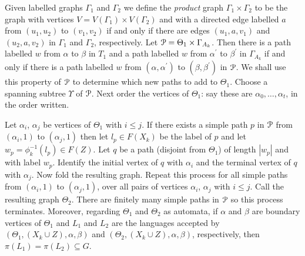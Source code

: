 \documentclass[a4paper,12pt]{article}
\renewcommand{\a}{\alpha }
\renewcommand{\b}{\beta }
\newcommand{\G}{\Gamma }
\newcommand{\T}{\Theta }
\newcommand{\U}{\Upsilon }
\newcommand{\cP}{{\cal{P}}}
\numberwithin{equation}{section}
\numberwithin{figure}{section}
\begin{document}
Given labelled graphs $\G_1$ and $\G_2$ we define the {\em
product} graph $\G_1\times \G_2$ to be the graph with vertices
$V=V(\G_1)\times V(\G_2)$ and with a directed edge labelled $a$
from $(u_1,u_2)$ to $(v_1,v_2)$ if and only if there are edges
$(u_1,a, v_1)$ and $(u_2,a,v_2)$ in $\G_1$ and $\G_2$,
respectively. Let $\cP=\T_1\times \G_{A_k}$. Then there is a path
 labelled $w$ from $\a$ to $\b$
in $T_1$ {\ef {$\T_1$?}}and a path labelled $w$ from $\a^\prime $
to $\b^\prime$ in $\G_{A_k}$ if and only if there is a path
labelled $w$ from $(\a,\a^\prime)$ to $(\b,\b^\prime)$ in $\cP$.
 We shall
use this property of $\cP$ to determine which new paths to add  to $\T_1$.
Choose a spanning  subtree $\U$ of  $\cP$. Next
 order the vertices of
$\T_1$: say these are $\a_0,\ldots, \a_t$, in the order written.

Let $\a_i$, $\a_j$ be vertices of  $\T_1$ with $i\le j$. If there
exists a simple path $p$ in $\cP$ from $(\a_i,1)$ to $(\a_j,1)$
then let $l_p\in F(X_k)$ be the label of $p$ and let
$w_p=\phi_k^{-1}(l_p)\in F(Z)$. Let $q$ be a path (disjoint from
$\T_1$) of length $|w_p|$ and with label $w_p$. Identify the
initial vertex of $q$ with $\a_i$ and the terminal vertex of $q$
with $\a_j$. Now fold the resulting graph. Repeat this process for
all simple paths from  $(\a_i,1)$ to $(\a_j,1)$, over all pairs of
vertices $\a_i$, $\a_j$ with $i\le j$. Call the resulting graph
$\T_2$. There are finitely many simple paths in $\cP$ so this
process terminates. Moreover, regarding $\T_1$ and $\T_2$ as
automata, if $\a$ and
 $\b$ are
boundary vertices of $\T_1$ and $L_1$ and $L_2$ are the
languages accepted by $(\T_1,(X_k\cup Z), \a,\b)$ and
$(\T_2,(X_k\cup Z), \a,\b)$, respectively, then $\pi(L_1)=\pi(L_2)\subseteq G$.
\end{document}
